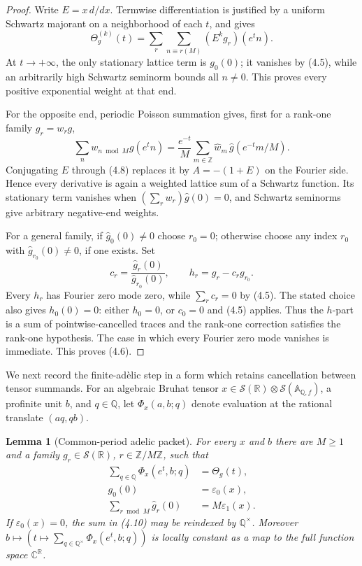 \documentclass[11pt,reqno]{amsart}
\newtheorem{lemma}[theorem]{Lemma}
\newcommand{\C}{\mathbb C}
\newcommand{\R}{\mathbb R}
\newcommand{\Q}{\mathbb Q}
\newcommand{\Z}{\mathbb Z}
\newcommand{\A}{\mathbb A}
\newcommand{\eps}{\varepsilon}
\newcommand{\cS}{\mathcal S}
\begin{document}
\begin{proof}
Write $E=x\,d/dx$.  Termwise differentiation is justified by a uniform Schwartz majorant on a
neighborhood of each $t$, and gives
\[
 \Theta_g^{(k)}(t)=\sum_{r}\sum_{n\equiv r(M)}(E^kg_r)(e^tn). \tag{4.7}
\]
At $t\to+\infty$, the only stationary lattice term is $g_0(0)$; it vanishes by (4.5), while an
arbitrarily high Schwartz seminorm bounds all $n\ne0$.  This proves every positive exponential
weight at that end.

For the opposite end, periodic Poisson summation gives, first for a rank-one family
$g_r=w_r g$,
\[
 \sum_n w_{n\bmod M}g(e^tn)
 =\frac{e^{-t}}{M}\sum_{m\in\Z}\widehat w_m\,\widehat g(e^{-t}m/M). \tag{4.8}
\]
Conjugating $E$ through (4.8) replaces it by $A=-(1+E)$ on the Fourier side.  Hence every
derivative is again a weighted lattice sum of a Schwartz function.  Its stationary term vanishes
when $(\sum_rw_r)\widehat g(0)=0$, and Schwartz seminorms give arbitrary negative-end weights.

For a general family, if $\widehat g_0(0)\ne0$ choose $r_0=0$; otherwise choose any index
$r_0$ with $\widehat g_{r_0}(0)\ne0$, if one exists.  Set
\[
 c_r=\frac{\widehat g_r(0)}{\widehat g_{r_0}(0)},\qquad
 h_r=g_r-c_rg_{r_0}.                                \tag{4.9}
\]
Every $h_r$ has Fourier zero mode zero, while $\sum_rc_r=0$ by (4.5).  The stated choice also gives
$h_0(0)=0$: either $h_0=0$, or $c_0=0$ and (4.5) applies.  Thus the $h$-part is a sum
of pointwise-cancelled traces and the rank-one correction satisfies the rank-one hypothesis.
The case in which every Fourier zero mode vanishes is immediate.  This proves (4.6).
\end{proof}

We next record the finite-ad\`elic step in a form which retains cancellation between tensor
summands.  For an algebraic Bruhat tensor
$x\in\cS(\R)\otimes\cS(\A_{\Q,f})$, a profinite unit $b$, and $q\in\Q$, let
$\Phi_x(a,b;q)$ denote evaluation at the rational translate $(aq,qb)$.

\begin{lemma}[Common-period adelic packet]\label{lem:packet}
For every $x$ and $b$ there are $M\ge1$ and a family
$g_r\in\cS(\R)$, $r\in\Z/M\Z$, such that
\begin{align}
 \sum_{q\in\Q}\Phi_x(e^t,b;q)&=\Theta_g(t),                 \tag{4.10}\\
 g_0(0)&=\eps_0(x),                                         \tag{4.11}\\
 \sum_{r\bmod M}\widehat g_r(0)&=M\eps_1(x).               \tag{4.12}
\end{align}
If $\eps_0(x)=0$, the sum in \textup{(4.10)} may be reindexed by $\Q^\times$.
Moreover $b\mapsto(t\mapsto\sum_{q\in\Q^\times}\Phi_x(e^t,b;q))$ is locally constant as a map
to the full function space $\C^\R$.
\end{lemma}
\end{document}
